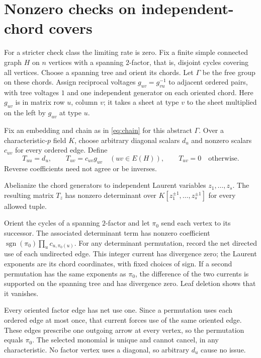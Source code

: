 \section{Nonzero checks on independent-chord covers}\label{sec:weighted}

For a stricter check class the limiting rate is zero. Fix a finite
simple connected graph $H$ on $n$ vertices with a spanning $2$-factor,
that is, disjoint cycles covering all vertices. Choose a spanning
tree and orient its chords. Let $\Gamma$ be the free group on these
chords. Assign reciprocal voltages $g_{uv}=g_{vu}^{-1}$ to adjacent
ordered pairs, with tree voltages $1$ and one independent generator
on each oriented chord. Here $g_{uv}$ is in matrix row $u$, column
$v$; it takes a sheet at type $v$ to the sheet multiplied on the
left by $g_{uv}$ at type $u$.

Fix an embedding and chain as in \eqref{eq:chain} for this abstract
$\Gamma$. Over a characteristic-$p$ field $K$, choose arbitrary
diagonal scalars $d_u$ and nonzero scalars $c_{uv}$ for every ordered
edge. Define
\begin{equation}\label{eq:weighted}
 T_{uu}=d_u,\qquad T_{uv}=c_{uv}g_{uv}\quad(uv\in E(H)),
 \qquad T_{uv}=0\quad\text{otherwise}.
\end{equation}
Reverse coefficients need not agree or be inverses.

\begin{lemma}\label{lem:determinant}
\notformalized
Abelianize the chord generators to independent Laurent variables
$z_1,\ldots,z_s$. The resulting matrix $T_z$ has nonzero determinant
over $K[z_1^{\pm1},\ldots,z_s^{\pm1}]$ for every allowed tuple.
\end{lemma}
\begin{informalproof}
Orient the cycles of a spanning $2$-factor and let $\pi_0$ send each
vertex to its successor. The associated determinant term has nonzero
coefficient $\operatorname{sgn}(\pi_0)\prod_uc_{u,\pi_0(u)}$.
For any determinant permutation, record the net directed use of each
undirected edge. This integer current has divergence zero; the
Laurent exponents are its chord coordinates, with fixed choices of
sign. If a second permutation has the same exponents as $\pi_0$,
the difference of the two currents is supported on the spanning
tree and has divergence zero. Leaf deletion shows that it vanishes.

Every oriented factor edge has net use one. Since a permutation
uses each ordered edge at most once, that current forces use of
the same oriented edge. These edges prescribe one outgoing arrow
at every vertex, so the permutation equals $\pi_0$. The selected
monomial is unique and cannot cancel, in any characteristic.
No factor vertex uses a diagonal, so arbitrary $d_u$ cause no issue.
\end{informalproof}

